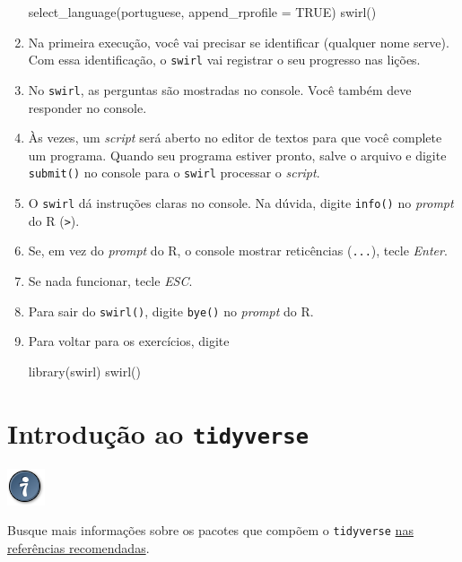 \documentclass[
  11pt]{report}
\newenvironment{Shaded}{\begin{snugshade}}{\end{snugshade}}
\newcommand{\AttributeTok}[1]{\textcolor[rgb]{0.77,0.63,0.00}{#1}}
\newcommand{\ConstantTok}[1]{\textcolor[rgb]{0.00,0.00,0.00}{#1}}
\newcommand{\FunctionTok}[1]{\textcolor[rgb]{0.00,0.00,0.00}{#1}}
\newcommand{\NormalTok}[1]{#1}
\newcommand{\StringTok}[1]{\textcolor[rgb]{0.31,0.60,0.02}{#1}}
\newenvironment{rmdtip}
{
  \begin{mytip}
    \includegraphics{images/tip.png}
    \tcblower
  }
  {
  \end{mytip}
}
\renewenvironment{Shaded}{
    \begin{mdframed}[%
      roundcorner=2pt,%
      innerleftmargin=5pt,%
      innerrightmargin=5pt,%
      topline=true,%
      leftline=true,%
      rightline=true,%
      bottomline=true,%
      linewidth=0.5pt,%
      linecolor=black!20,%
      backgroundcolor=black!2,%
      skipabove=2ex,%
      skipbelow=2.5ex%
    ]%
  }
  {
    \end{mdframed}
  }
\begin{document}
\begin{enumerate}
\begin{Shaded}
\begin{Highlighting}[]
\FunctionTok{select\_language}\NormalTok{(}\StringTok{\textquotesingle{}portuguese\textquotesingle{}}\NormalTok{, }\AttributeTok{append\_rprofile =} \ConstantTok{TRUE}\NormalTok{)}
\FunctionTok{swirl}\NormalTok{()}
\end{Highlighting}
\end{Shaded}
\item
  Na primeira execução, você vai precisar se identificar (qualquer nome serve). Com essa identificação, o \texttt{swirl} vai registrar o seu progresso nas lições.
\item
  No \texttt{swirl}, as perguntas são mostradas no console. Você também deve responder no console.
\item
  Às vezes, um \emph{script} será aberto no editor de textos para que você complete um programa. Quando seu programa estiver pronto, salve o arquivo e digite \texttt{submit()} no console para o \texttt{swirl} processar o \emph{script}.
\item
  O \texttt{swirl} dá instruções claras no console. Na dúvida, digite \texttt{info()} no \emph{prompt} do R (\texttt{\textgreater{}}).
\item
  Se, em vez do \emph{prompt} do R, o console mostrar reticências (\texttt{...}), tecle \emph{Enter}.
\item
  Se nada funcionar, tecle \emph{ESC}.
\item
  Para sair do \texttt{swirl()}, digite \texttt{bye()} no \emph{prompt} do R.
\item
  Para voltar para os exercícios, digite

\begin{Shaded}
\begin{Highlighting}[]
\FunctionTok{library}\NormalTok{(swirl)}
\FunctionTok{swirl}\NormalTok{()}
\end{Highlighting}
\end{Shaded}
\end{enumerate}

\hypertarget{introduuxe7uxe3o-ao-tidyverse}{%
\chapter{\texorpdfstring{Introdução ao \texttt{tidyverse}}{Introdução ao tidyverse}}\label{introduuxe7uxe3o-ao-tidyverse}}

\begin{rmdtip}
Busque mais informações sobre os pacotes que compõem o \texttt{tidyverse} \protect\hyperlink{refrec}{nas referências recomendadas}.

\end{rmdtip}
\end{document}
